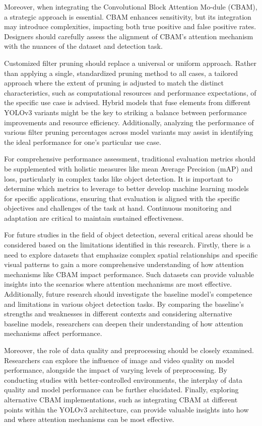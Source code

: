 Moreover, when integrating the Convolutional Block Attention Mo-dule (CBAM), a strategic approach is essential. CBAM enhances sensitivity, but its integration may introduce complexities, impacting both true positive and false positive rates. Designers should carefully assess the alignment of CBAM's attention mechanism with the nuances of the dataset and detection task.

Customized filter pruning should replace a universal or uniform approach. Rather than applying a single, standardized pruning method to all cases, a tailored approach where the extent of pruning is adjusted to match the distinct characteristics, such as computational resources and performance expectations, of the specific use case is advised. Hybrid models that fuse elements from different YOLOv3 variants might be the key to striking a balance between performance improvements and resource efficiency. Additionally, analyzing the performance of various filter pruning percentages across model variants may assist in identifying the ideal performance for one's particular use case.

For comprehensive performance assessment, traditional evaluation metrics should be supplemented with holistic measures like mean Average Precision (mAP) and loss, particularly in complex tasks like object detection. It is important to determine which metrics to leverage to better develop machine learning models for specific applications, ensuring that evaluation is aligned with the specific objectives and challenges of the task at hand. Continuous monitoring and adaptation are critical to maintain sustained effectiveness.

For future studies in the field of object detection, several critical areas should be considered based on the limitations identified in this research. Firstly, there is a need to explore datasets that emphasize complex spatial relationships and specific visual patterns to gain a more comprehensive understanding of how attention mechanisms like CBAM impact performance. Such datasets can provide valuable insights into the scenarios where attention mechanisms are most effective. Additionally, future research should investigate the baseline model's competence and limitations in various object detection tasks. By comparing the baseline's strengths and weaknesses in different contexts and considering alternative baseline models, researchers can deepen their understanding of how attention mechanisms affect performance.

Moreover, the role of data quality and preprocessing should be closely examined. Researchers can explore the influence of image and video quality on model performance, alongside the impact of varying levels of preprocessing. By conducting studies with better-controlled environments, the interplay of data quality and model performance can be further elucidated. Finally, exploring alternative CBAM implementations, such as integrating CBAM at different points within the YOLOv3 architecture, can provide valuable insights into how and where attention mechanisms can be most effective.


